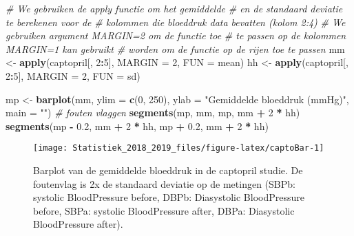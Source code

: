 \documentclass[12pt,dutch,coursenotes]{book}
\newenvironment{Shaded}{\begin{snugshade}}{\end{snugshade}}
\newcommand{\KeywordTok}[1]{\textcolor[rgb]{0.13,0.29,0.53}{\textbf{#1}}}
\newcommand{\DataTypeTok}[1]{\textcolor[rgb]{0.13,0.29,0.53}{#1}}
\newcommand{\DecValTok}[1]{\textcolor[rgb]{0.00,0.00,0.81}{#1}}
\newcommand{\FloatTok}[1]{\textcolor[rgb]{0.00,0.00,0.81}{#1}}
\newcommand{\StringTok}[1]{\textcolor[rgb]{0.31,0.60,0.02}{#1}}
\newcommand{\CommentTok}[1]{\textcolor[rgb]{0.56,0.35,0.01}{\textit{#1}}}
\newcommand{\OperatorTok}[1]{\textcolor[rgb]{0.81,0.36,0.00}{\textbf{#1}}}
\newcommand{\NormalTok}[1]{#1}
\theoremstyle{definition}
\theoremstyle{definition}
\theoremstyle{definition}
\theoremstyle{remark}
\begin{document}
\begin{Shaded}
\begin{Highlighting}[]
\CommentTok{# We gebruiken de apply functie om het gemiddelde}
\CommentTok{# en de standaard deviatie te berekenen voor de}
\CommentTok{# kolommen die bloeddruk data bevatten (kolom 2:4)}
\CommentTok{# We gebruiken argument MARGIN=2 om de functie toe}
\CommentTok{# te passen op de kolommen MARGIN=1 kan gebruikt}
\CommentTok{# worden om de functie op de rijen toe te passen}
\NormalTok{mm <-}\StringTok{ }\KeywordTok{apply}\NormalTok{(captopril[, }\DecValTok{2}\OperatorTok{:}\DecValTok{5}\NormalTok{], }\DataTypeTok{MARGIN =} \DecValTok{2}\NormalTok{, }\DataTypeTok{FUN =}\NormalTok{ mean)}
\NormalTok{hh <-}\StringTok{ }\KeywordTok{apply}\NormalTok{(captopril[, }\DecValTok{2}\OperatorTok{:}\DecValTok{5}\NormalTok{], }\DataTypeTok{MARGIN =} \DecValTok{2}\NormalTok{, }\DataTypeTok{FUN =}\NormalTok{ sd)}

\NormalTok{mp <-}\StringTok{ }\KeywordTok{barplot}\NormalTok{(mm, }\DataTypeTok{ylim =} \KeywordTok{c}\NormalTok{(}\DecValTok{0}\NormalTok{, }\DecValTok{250}\NormalTok{), }\DataTypeTok{ylab =} \StringTok{"Gemiddelde bloeddruk (mmHg)"}\NormalTok{, }
    \DataTypeTok{main =} \StringTok{""}\NormalTok{)}
\CommentTok{# fouten vlaggen}
\KeywordTok{segments}\NormalTok{(mp, mm, mp, mm }\OperatorTok{+}\StringTok{ }\DecValTok{2} \OperatorTok{*}\StringTok{ }\NormalTok{hh)}
\KeywordTok{segments}\NormalTok{(mp }\OperatorTok{-}\StringTok{ }\FloatTok{0.2}\NormalTok{, mm }\OperatorTok{+}\StringTok{ }\DecValTok{2} \OperatorTok{*}\StringTok{ }\NormalTok{hh, mp }\OperatorTok{+}\StringTok{ }\FloatTok{0.2}\NormalTok{, mm }\OperatorTok{+}\StringTok{ }\DecValTok{2} \OperatorTok{*}\StringTok{ }
\StringTok{    }\NormalTok{hh)}
\end{Highlighting}
\end{Shaded}

\begin{figure}

{\centering \texttt{[image: Statistiek\_2018\_2019\_files/figure-latex/captoBar-1]} 

}

\caption{Barplot van de gemiddelde bloeddruk in de captopril studie. De foutenvlag is 2x de standaard deviatie op de metingen (SBPb: systolic BloodPressure before, DBPb: Diasystolic BloodPressure before, SBPa: systolic BloodPressure after, DBPa: Diasystolic BloodPressure after).}\label{fig:captoBar}
\end{figure}
\end{document}
